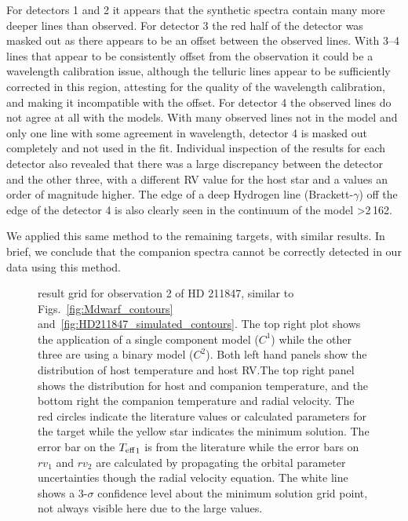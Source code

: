 For detectors 1 and 2 it appears that the synthetic spectra contain many more deeper lines than observed. For detector 3 the red half of the detector was masked out as there appears to be an offset between the observed lines. With 3--4 lines that appear to be consistently offset from the observation it could be a wavelength calibration issue, although the telluric lines appear to be sufficiently corrected in this region, attesting for the quality of the wavelength calibration, and making it incompatible with the offset. For detector 4 the observed lines do not agree at all with the models. With many observed lines not in the model and only one line with some agreement in wavelength, detector 4 is masked out completely and not used in the \textchisquared{} fit. Individual inspection of the \textchisquared{} results for each detector also revealed that there was a large discrepancy between the  detector and the other three, with a different {RV} value for the host star and a \textchisquared{} values an order of magnitude higher. The edge of a deep Hydrogen line (Brackett-\(\gamma\)) off the edge of the detector 4 is also clearly seen in the continuum of the model >2\,162\nm{}.

We applied this same method to the remaining targets, with similar results. In brief, we conclude that the companion spectra cannot be correctly detected in our data using this method.
\begin{figure*}
    \centering
    \caption{\textchisquared{} result grid for observation 2 of {HD 211847}, similar to Figs.~\ref{fig:Mdwarf_contours} and~\ref{fig:HD211847_simulated_contours}. The top right plot shows the application of a single component model (\(C^1\)) while the other three are using a binary model (\(C^2\)). Both left hand panels show the distribution of host temperature and host {RV}.\@ The top right panel shows the distribution for host and companion temperature, and the bottom right the companion temperature and radial velocity. The red circles indicate the literature values or calculated parameters for the target while the yellow star indicates the minimum \textchisquared{} solution. The error bar on the \({T_{\mathrm{eff}}}_{1}\) is from the literature while the error bars on \({rv}_1\) and \({rv}_2\) are calculated by propagating the orbital parameter uncertainties though the radial velocity equation. The white line shows a 3-\(\sigma\) confidence level about the minimum \textchisquared{} solution grid point, not always visible here due to the large \textchisquared{} values.}
    \label{fig:HD211847_result_contours}
\end{figure*}


